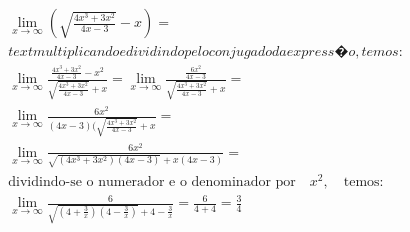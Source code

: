 \begin{ex}
\begin{align}
&\lim_{x\rightarrow \infty} \left(\sqrt{\frac{4x^3+3x^2}{4x-3}}-x\right)=\nonumber\\
&text{multiplicando e dividindo pelo conjugado da express�o, temos:}\nonumber\\
&\lim_{x\rightarrow \infty} \frac{\frac{4x^3+3x^2}{4x-3}-x^2}{\sqrt{\frac{4x^3+3x^2}{4x-3}}+x}=\lim_{x\rightarrow \infty} \frac{\frac{6x^2}{4x-3}}{\sqrt{\frac{4x^3+3x^2}{4x-3}}+x}=\nonumber\\
&\lim_{x\rightarrow \infty} \frac{6x^2}{(4x-3)(\sqrt{\frac{4x^3+3x^2}{4x-3}}+x}=\nonumber\\
&\lim_{x\rightarrow \infty} \frac{6x^2}{\sqrt{(4x^3+3x^2)(4x-3)}+x(4x-3)}=\nonumber\\
&\text{dividindo-se o numerador e o denominador por} \quad x^2,\quad \text{temos:}\nonumber\\
&\lim_{x\rightarrow \infty} \frac{6}{\sqrt{(4+\frac{3}{x})(4-\frac{3}{x})}+4-\frac{3}{x}}=\frac{6}{4+4}=\frac{3}{4}\nonumber
\end{align}
\end{ex}